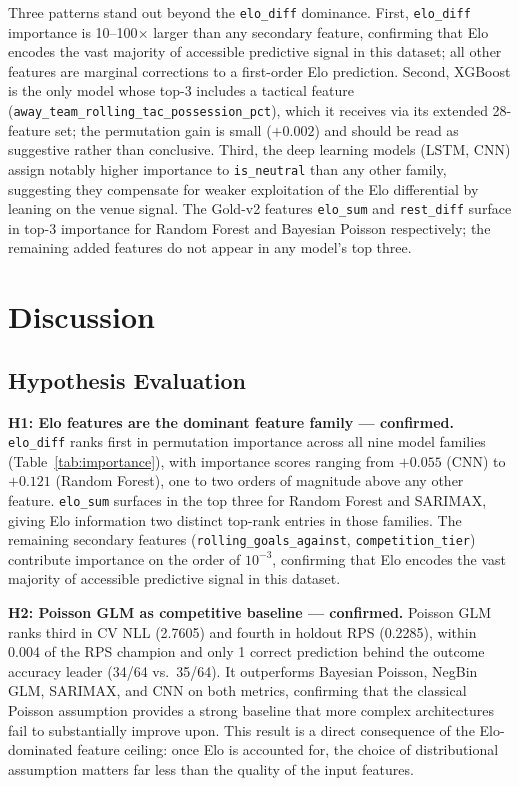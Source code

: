 \documentclass[conference]{IEEEtran}
\begin{document}
Three patterns stand out beyond the \texttt{elo\_diff} dominance.
First, \texttt{elo\_diff} importance is 10--100$\times$ larger than any
secondary feature, confirming that Elo encodes the vast majority of
accessible predictive signal in this dataset; all other features are
marginal corrections to a first-order Elo prediction.
Second, XGBoost is the only model whose top-3 includes a tactical feature
(\texttt{away\_team\_rolling\_tac\_possession\_pct}), which it receives via
its extended 28-feature set; the permutation gain is small ($+0.002$) and
should be read as suggestive rather than conclusive.
Third, the deep learning models (LSTM, CNN) assign notably higher importance
to \texttt{is\_neutral} than any other family, suggesting they compensate
for weaker exploitation of the Elo differential by leaning on the venue
signal.  The Gold-v2 features \texttt{elo\_sum} and \texttt{rest\_diff}
  surface in top-3 importance for Random Forest and Bayesian Poisson
  respectively; the remaining added features do not appear in any model's
  top three.

\section{Discussion}
\label{sec:discussion}

\subsection{Hypothesis Evaluation}

\textbf{H1: Elo features are the dominant feature family --- confirmed.}
\texttt{elo\_diff} ranks first in permutation importance across all nine
model families (Table~\ref{tab:importance}), with importance scores ranging
from $+0.055$ (CNN) to $+0.121$ (Random Forest), one to two orders of
magnitude above any other feature.  \texttt{elo\_sum} surfaces in the top three for Random Forest and SARIMAX,
giving Elo information two distinct top-rank entries in those families.  The
remaining secondary features (\texttt{rolling\_goals\_against},
\texttt{competition\_tier}) contribute importance on the order of
$10^{-3}$, confirming that Elo encodes the vast majority of accessible
predictive signal in this dataset.

\textbf{H2: Poisson GLM as competitive baseline --- confirmed.}
Poisson GLM ranks third in CV NLL (2.7605) and fourth in holdout RPS
(0.2285), within 0.004 of the RPS champion and only 1 correct prediction
behind the outcome accuracy leader (34/64 vs.\ 35/64).  It outperforms
Bayesian Poisson, NegBin GLM, SARIMAX, and CNN on both metrics,
confirming that the classical Poisson assumption provides a strong baseline
that more complex architectures fail to substantially improve upon.  This
result is a direct consequence of the Elo-dominated feature ceiling: once
Elo is accounted for, the choice of distributional assumption matters far
less than the quality of the input features.
\end{document}
